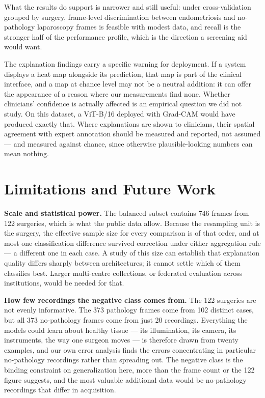 \documentclass[preprint,12pt]{elsarticle}
\begin{document}
What the results do support is narrower and still useful: under cross-validation grouped by surgery, frame-level discrimination between endometriosis and no-pathology laparoscopy frames is feasible with modest data, and recall is the stronger half of the performance profile, which is the direction a screening aid would want.

The explanation findings carry a specific warning for deployment. If a system displays a heat map alongside its prediction, that map is part of the clinical interface, and a map at chance level may not be a neutral addition: it can offer the appearance of a reason where our measurements find none. Whether clinicians' confidence is actually affected is an empirical question we did not study. On this dataset, a ViT-B/16 deployed with Grad-CAM would have produced exactly that. Where explanations are shown to clinicians, their spatial agreement with expert annotation should be measured and reported, not assumed --- and measured against chance, since otherwise plausible-looking numbers can mean nothing.

\section{Limitations and Future Work}
\label{sec:limitations}

\textbf{Scale and statistical power.} The balanced subset contains 746 frames from 122 surgeries, which is what the public data allow. Because the resampling unit is the surgery, the effective sample size for every comparison is of that order, and at most one classification difference survived correction under either aggregation rule --- a different one in each case. A study of this size can establish that explanation quality differs sharply between architectures; it cannot settle which of them classifies best. Larger multi-centre collections, or federated evaluation across institutions, would be needed for that.

\textbf{How few recordings the negative class comes from.} The 122 surgeries are not evenly informative. The 373 pathology frames come from 102 distinct cases, but all 373 no-pathology frames come from just 20 recordings. Everything the models could learn about healthy tissue --- its illumination, its camera, its instruments, the way one surgeon moves --- is therefore drawn from twenty examples, and our own error analysis finds the errors concentrating in particular no-pathology recordings rather than spreading out. The negative class is the binding constraint on generalization here, more than the frame count or the 122 figure suggests, and the most valuable additional data would be no-pathology recordings that differ in acquisition.
\end{document}
